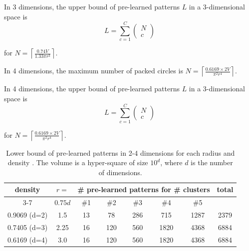 \documentclass[lettersize,journal]{IEEEtran}
\begin{document}
\begin{thm}
In 3 dimensions, the upper bound of pre-learned patterns $L$ in a 3-dimensional space is 
\begin{equation}
L = \sum\limits_{c=1}^{C} \left ( \begin{array}{c} 
                                   N \\
                                   c
                                  \end{array} \right )
\end{equation}
\end{thm}
\noindent
for $N = \left \lceil \frac{0.74V}{1.33\pi r^{3}} \right \rceil$.

\begin{lemma}
In 4 dimensions, the maximum number of packed circles is $N = \left \lceil \frac{0.6169\times2V}{\pi^{2} 
r^{4}} \right \rceil $.
\end{lemma}
 
\begin{thm}
In 4 dimensions, the upper bound of pre-learned patterns $L$ in a 3-dimensional space is 
\begin{equation}
L = \sum\limits_{c=1}^{C} \left ( \begin{array}{c} 
                                   N \\
                                   c
                                  \end{array} \right )
\end{equation}
\end{thm}
\noindent
for $N = \left \lceil \frac{0.6169\times2V}{\pi^{2} r^{4}} \right \rceil$.
\begin{table}[t]
\caption{Lower bound of pre-learned patterns in 2-4 dimensions for each radius and density \cite{Gaber}. 
The volume is a hyper-square of size $10^{d}$, where $d$ is the number of dimensions.}
\begin{center}
\begin{tabular}{|c|c|c|c|c|c|c|c|}\hline
\multirow{2}{*}{density \cite{Gaber}} & $r =$ & \multicolumn{5}{c|}{\# pre-learned patterns for \# clusters} 
 & \multirow{2}{*}{total} \\ \cline{3-7}
 & $0.75d$ & \#1 & \#2 & \#3 & \#4 & \#5 & \\ \hline
0.9069 (d=2) & 1.5 & 13 & 78 & 286 & 715 & 1287 & 2379 \\ \hline
0.7405 (d=3) & 2.25 & 16 & 120 & 560 & 1820 & 4368 & 6884 \\ \hline
0.6169 (d=4) & 3.0 & 16 & 120 & 560 & 1820 & 4368 & 6884 \\ \hline
\end{tabular}
\end{center}
\end{table}
\end{document}
